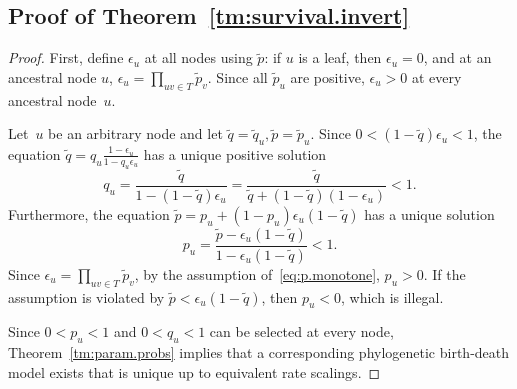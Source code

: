 \documentclass{elsarticle}
\newcommand{\nx}{u}
\newcommand{\ny}{v}
\begin{document}
\subsection{Proof of Theorem~\ref{tm:survival.invert}}
\begin{proof}
First, define $\epsilon_{\nx}$ at all nodes using $\tilde{p}$: if $\nx$ is a leaf, then 
$\epsilon_{\nx}=0$, and at an ancestral node $\nx$,  
$\epsilon_{\nx} = \prod_{\nx\ny\in T} \tilde{p}_{\ny}$. 
Since all $\tilde{p}_{\nx}$ are positive, $\epsilon_{\nx}>0$ at every ancestral node~$\nx$.  

Let~$\nx$ be an arbitrary node and let $\tilde{q}=\tilde{q}_{\nx}, \tilde{p}=\tilde{p}_{\nx}$. 
Since $0<(1-\tilde{q})\epsilon_{\nx}<1$,  
the equation
$
\tilde{q} = q_{\nx} \frac{1-\epsilon_{\nx}}{1-q_{\nx}\epsilon_{\nx}}
$
has a unique positive solution 
\[
q_{\nx} = \frac{\tilde{q}}{1-(1-\tilde{q})\epsilon_{\nx}}
= \frac{\tilde{q}}{\tilde{q}+(1-\tilde{q})(1-\epsilon_{\nx})}<1.
\]
Furthermore, the equation 
$
\tilde{p}=p_{\nx}+(1-p_{\nx})\epsilon_{\nx}(1-\tilde{q})
$
has a unique solution 
\[
p_{\nx} =  \frac{\tilde{p}-\epsilon_{\nx}(1-\tilde{q})}{1-\epsilon_{\nx}(1-\tilde{q})}<1.
\] 
Since $\epsilon_{\nx}=\prod_{\nx\ny\in T}\tilde{p}_{\ny}$, 
by the assumption of~\eqref{eq:p.monotone}, $p_{\nx}>0$. 
If the assumption is violated by 
$\tilde{p}<\epsilon_{\nx}(1-\tilde{q})$, then $p_{\nx}<0$, which is illegal.  

Since $0<p_{\nx}<1$ and $0<q_{\nx}<1$ can be selected at every node, 
Theorem~\ref{tm:param.probs} implies that a
corresponding phylogenetic birth-death model exists that is unique 
up to equivalent rate scalings.      
\end{proof}
\end{document}
